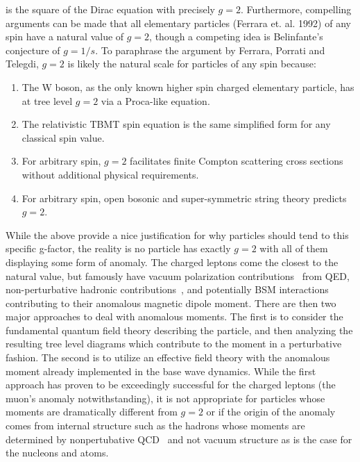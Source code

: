  is the square of the Dirac equation with precisely $g=2$. Furthermore, compelling arguments can be made that all elementary particles (Ferrara et. al. 1992) of any spin have a natural value of $g=2$, though a competing idea is Belinfante's conjecture of $g=1/s$. To paraphrase the argument by Ferrara, Porrati and Telegdi, $g=2$ is likely the natural scale for particles of any spin because:
\begin{enumerate}[nosep]
	\item The W boson, as the only known higher spin charged elementary particle, has at tree level $g=2$ via a Proca-like equation.
	\item The relativistic TBMT spin equation is the same simplified form for any classical spin value.
	\item For arbitrary spin, $g=2$ facilitates finite Compton scattering cross sections without additional physical requirements.
	\item For arbitrary spin, open bosonic and super-symmetric string theory predicts $g=2$.
\end{enumerate}
While the above provide a nice justification for why particles should tend to this specific g-factor, the reality is no particle has exactly $g=2$ with all of them displaying some form of anomaly. The charged leptons come the closest to the natural value, but famously have vacuum polarization contributions~\cite{Schwinger:1951nm} from QED, non-perturbative hadronic contributions~\cite{Jegerlehner:2001wq,Jegerlehner:2017gek}, and potentially BSM interactions~\cite{Czarnecki:2001pv,Knecht:2004,Jegerlehner:2009ry} contributing to their anomalous magnetic dipole moment. There are then two major approaches to deal with anomalous moments. The first is to consider the fundamental quantum field theory describing the particle, and then analyzing the resulting tree level diagrams which contribute to the moment in a perturbative fashion. The second is to utilize an effective field theory with the anomalous moment already implemented in the base wave dynamics. While the first approach has proven to be exceedingly successful for the charged leptons (the muon's anomaly notwithstanding), it is not appropriate for particles whose moments are dramatically different from $g=2$ or if the origin of the anomaly comes from internal structure such as the hadrons whose moments are determined by nonpertubative QCD~\cite{Eichmann:2016yit,Pacetti:2014jai} and not vacuum structure as is the case for the nucleons and atoms.

